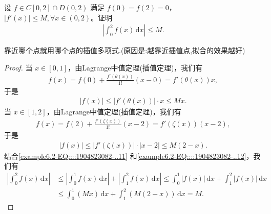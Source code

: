 \documentclass[../../main.tex]{subfiles}%
\begin{document}
\begin{example}
设 $f \in C[0,2] \cap D(0,2)$ 满足 $f(0) = f(2) = 0$，$|f'(x)| \leqslant  M, \forall x \in (0,2)$。证明
\begin{align*}
\left| \int_{0}^{2} f(x) \, \mathrm{d}x \right| \leqslant  M.
\end{align*}
\end{example}
\begin{note}
靠近哪个点就用哪个点的插值多项式.(原因是:越靠近插值点,拟合的效果越好)
\end{note}
\begin{proof}

当 $x \in [0,1]$，由Lagrange中值定理(插值定理)，我们有
\begin{align*}
f(x) = f(0) + \frac{f'(\theta(x))}{1!} (x - 0) = f'(\theta(x)) x,
\end{align*}
于是
\begin{align}
|f(x)| \leqslant  |f'(\theta(x))| \cdot x \leqslant  Mx.\label{example6.2-EQ::::1904823082-..11}
\end{align}
当 $x \in [1,2]$，由Lagrange中值定理(插值定理)，我们有
\begin{align*}
f(x) = f(2) + \frac{f'(\zeta(x))}{1!} (x - 2) = f'(\zeta(x)) (x - 2),
\end{align*}
于是
\begin{align}
|f(x)| \leqslant  |f'(\zeta(x))| \cdot |x - 2| \leqslant  M(2 - x).\label{example6.2-EQ::::1904823082-..12}
\end{align}
结合\eqref{example6.2-EQ::::1904823082-..11} 和\eqref{example6.2-EQ::::1904823082-..12}，我们有
\begin{align*}
\left| \int_{0}^{2} f(x) \, \mathrm{d}x \right| &\leqslant  \left| \int_{0}^{1} f(x) \, \mathrm{d}x \right| + \left| \int_{1}^{2} f(x) \, \mathrm{d}x \right| 
\leqslant  \int_{0}^{1} |f(x)| \, \mathrm{d}x + \int_{1}^{2} |f(x)| \, \mathrm{d}x \\
&\leqslant  \int_{0}^{1} (Mx) \, \mathrm{d}x + \int_{1}^{2} (M(2 - x)) \, \mathrm{d}x 
= M.
\end{align*}

\end{proof}
\end{document}
